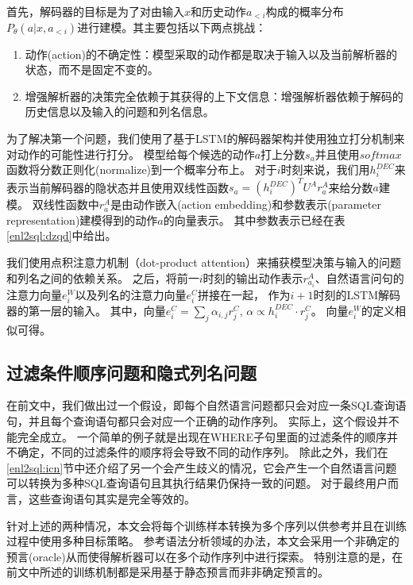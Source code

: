 首先，解码器的目标是为了对由输入$x$和历史动作$a_{<i}$构成的概率分布$P_{\theta}(a|x,a_{<i})$进行建模。其主要包括以下两点挑战：
\begin{enumerate}
  \item 动作(action)的不确定性：模型采取的动作都是取决于输入以及当前解析器的状态，而不是固定不变的。
  \item 增强解析器的决策完全依赖于其获得的上下文信息：增强解析器依赖于解码的历史信息以及输入的问题和列名信息。
\end{enumerate}

为了解决第一个问题，我们使用了基于LSTM的解码器架构并使用独立打分机制来对动作的可能性进行打分。
模型给每个候选的动作$a$打上分数$s_a$并且使用$softmax$函数将分数正则化(normalize)到一个概率分布上。
对于$i$时刻来说，我们用$h^{DEC}_i$来表示当前解码器的隐状态并且使用双线性函数$s_a = (h^{DEC}_i)^T U^A r^A_a$来给分数$a$建模。
双线性函数中$r^A_a$是由动作嵌入(action embedding)和参数表示(parameter representation)建模得到的动作$a$的向量表示。
其中参数表示已经在表\ref{enl2sql:dzqd}中给出。

我们使用点积注意力机制（dot-product attention）\cite{vaswani2017attention}来捕获模型决策与输入的问题和列名之间的依赖关系。
之后，将前一$i$时刻的输出动作表示$r^A_{a_i}$、自然语言问句的注意力向量$e^W_i$以及列名的注意力向量$e^C_i$拼接在一起，
作为$i+1$时刻的LSTM解码器的第一层的输入。
其中，向量$e^C_i = \sum_j \alpha_{i,j} r^C_j$,  $\alpha \propto h^{DEC}_i \cdot r^C_j$。
向量$e^W_i$的定义相似可得。



\subsection{过滤条件顺序问题和隐式列名问题}
\label{enl2sql:ndo}

在前文中，我们做出过一个假设，即每个自然语言问题都只会对应一条SQL查询语句，并且每个查询语句都只会对应一个正确的动作序列。
实际上，这个假设并不能完全成立。
一个简单的例子就是出现在WHERE子句里面的过滤条件的顺序并不确定，不同的过滤条件的顺序将会导致不同的动作序列。
除此之外，我们在\ref{enl2sql:icn}节中还介绍了另一个会产生歧义的情况，它会产生一个自然语言问题可以转换为多种SQL查询语句且其执行结果仍保持一致的问题。
对于最终用户而言，这些查询语句其实是完全等效的。

针对上述的两种情况，本文会将每个训练样本转换为多个序列以供参考并且在训练过程中使用多种目标策略。
参考语法分析领域的办法，本文会采用一个非确定的预言(oracle)从而使得解析器可以在多个动作序列中进行探索。
特别注意的是，在前文中所述的训练机制都是采用基于静态预言而非非确定预言的。

